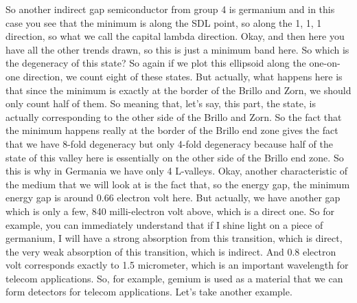 So another indirect gap semiconductor from group 4 is germanium and in this case you see that the minimum is along the SDL point, so along the 1, 1, 1 direction, so what we call the capital lambda direction. Okay, and then here you have all the other trends drawn, so this is just a minimum band here. So which is the degeneracy of this state? So again if we plot this ellipsoid along the one-on-one direction, we count eight of these states. But actually, what happens here is that since the minimum is exactly at the border of the Brillo and Zorn, we should only count half of them. So meaning that, let's say, this part, the state, is actually corresponding to the other side of the Brillo and Zorn. So the fact that the minimum happens really at the border of the Brillo end zone gives the fact that we have 8-fold degeneracy but only 4-fold degeneracy because half of the state of this valley here is essentially on the other side of the Brillo end zone. So this is why in Germania we have only 4 L-valleys. Okay, another characteristic of the medium that we will look at is the fact that, so the energy gap, the minimum energy gap is around 0.66 electron volt here. But actually, we have another gap which is only a few, 840 milli-electron volt above, which is a direct one. So for example, you can immediately understand that if I shine light on a piece of germanium, I will have a strong absorption from this transition, which is direct, the very weak absorption of this transition, which is indirect. And 0.8 electron volt corresponds exactly to 1.5 micrometer, which is an important wavelength for telecom applications. So, for example, gemium is used as a material that we can form detectors for telecom applications. Let's take another example.
